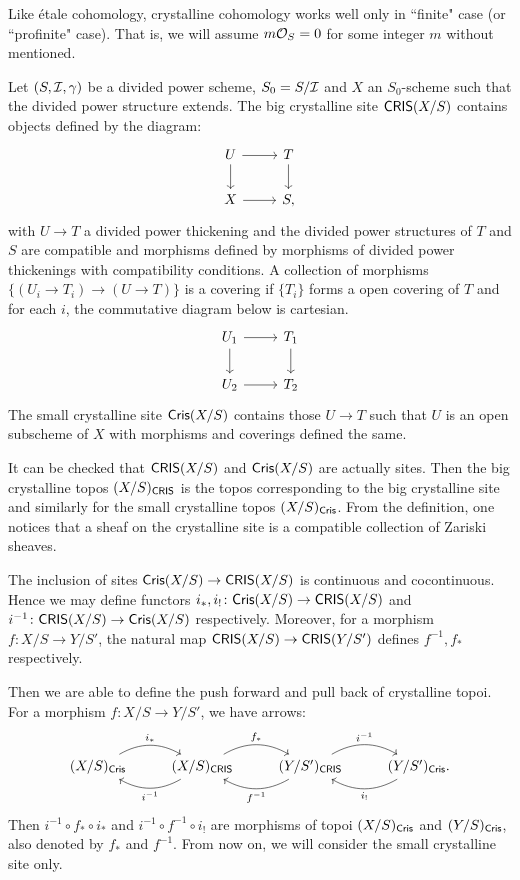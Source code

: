 Like \'etale cohomology, crystalline cohomology works well 
only in ``finite" case (or ``profinite" case). 
That is, we will assume $m {\mathcal {O}}_S=0$ for some integer $m$ without mentioned.
\begin{definition}
    Let $(S, {\mathcal {I}}, \gamma)$ be a divided power scheme, 
    $S_0 = S / {\mathcal {I}}$ and $X$ an $S_0$-scheme such that 
    the divided power structure extends. 
    The big crystalline site $\mathsf{CRIS}(X/S)$ contains objects defined by the diagram:
    \[
        \begin{tikzcd}
            U \ar[r] \ar[d] & T \ar[d] \\
            X \ar[r] & S,
        \end{tikzcd}
    \]
    with $U \to T$ a divided power thickening and 
    the divided power structures of $T$ and $S$ are compatible and 
    morphisms defined by 
    morphisms of divided power thickenings with compatibility conditions. 
    A collection of morphisms $\{(U_i \to T_i) \to (U \to T)\}$ is a covering 
    if $\{T_i\}$ forms a open covering of $T$ and for each $i$, 
    the commutative diagram below is cartesian.
    \[
        \begin{tikzcd}
            U_1 \ar[r] \ar[d] & T_1 \ar[d] \\
            U_2 \ar[r] & T_2
        \end{tikzcd}
    \]
    The small crystalline site $\mathsf{Cris}(X/S)$ contains those $U \to T$ 
    such that $U$ is an open subscheme of $X$ 
    with morphisms and coverings defined the same.
\end{definition}

It can be checked that $\mathsf{CRIS}(X/S)$ and $\mathsf{Cris}(X/S)$ are actually sites. 
Then the big crystalline topos $(X/S)_{\mathsf{CRIS}}$ is the topos 
corresponding to the big crystalline site 
and similarly for the small crystalline topos $(X/S)_{\mathsf{Cris}}$.
From the definition, one notices that 
a sheaf on the crystalline site is a compatible collection of Zariski sheaves.

The inclusion of sites $\mathsf{Cris}(X/S) \to \mathsf{CRIS}(X/S)$ is continuous and cocontinuous. 
Hence we may define functors $i_*, i_! \colon \mathsf{Cris}(X/S) \to \mathsf{CRIS}(X/S)$ 
and $i^{-1} \colon \mathsf{CRIS}(X/S) \to \mathsf{Cris}(X/S)$ respectively. 
Moreover, for a morphism $f\colon X/S \to Y/S'$, 
the natural map $\mathsf{CRIS}(X/S)\to \mathsf{CRIS}(Y/S')$ defines $f^{-1}, f_*$ respectively.

Then we are able to define the push forward 
and pull back of crystalline topoi. 
For a morphism $f \colon X/S \to Y/S'$, we have arrows:
\[
    \begin{tikzcd}
        (X/S)_{\Cris} \ar[r, "{i_*}", bend left] & 
        (X/S)_{\CRIS} \ar[l,"{i^{-1}}", bend left] \ar[r, "{f_*}", bend left] & 
        (Y/S')_{\CRIS} \ar[l, "{f^{-1}}", bend left] \ar[r, "{i^{-1}}", bend left] & 
        (Y/S')_{\Cris} \ar[l, "{i_!}", bend left].
    \end{tikzcd}
\]
Then $i^{-1} \circ f_* \circ i_*$ and $i^{-1} \circ f^{-1} \circ i_!$ 
are morphisms of topoi $(X/S)_{\mathsf{Cris}}$ and $(Y/S)_{\mathsf{Cris}}$, 
also denoted by $f_*$ and $f^{-1}$. 
From now on, we will consider the small crystalline site only.

